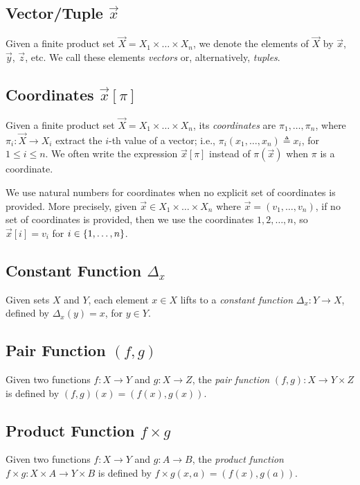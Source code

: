 \subsection{Vector/Tuple \texorpdfstring{$\vec{x}$}{x}}
Given a finite product set $\vec{X}=X_1\times \ldots \times X_n$, we denote the elements of $\vec{X}$ by $\vec{x}$, $\vec{y}$, $\vec{z}$, etc. We call these elements \emph{vectors} or, alternatively, \emph{tuples}. 

\subsection{Coordinates \texorpdfstring{$\vec{x}[\pi]$}{x[p]}}
Given a finite product set $\vec{X}=X_1\times \ldots \times X_n$, its \emph{coordinates} are $\pi_1, \ldots, \pi_n$, where $\pi_i\colon \vec{X} \rightarrow X_i$ extract the $i$-th value of a vector; i.e., $\pi_i(x_1, \ldots, x_n)\triangleq x_i$, for $1\leq i \leq n$. We often write the expression $\vec{x}[\pi]$ instead of $\pi(\vec{x})$ when $\pi$ is a coordinate. %

We use natural numbers for coordinates when no explicit set of coordinates is provided. More precisely, given $\vec{x}\in X_1\times \ldots \times X_n$ where $\vec{x}=(v_1, \ldots, v_n)$, if no set of coordinates is provided, then we use the coordinates $1, 2, \ldots , n$, so $\vec{x}[i]=v_i$ for $i\in \left\{1, \ldots, n\right\}$. 

\subsection{Constant Function \texorpdfstring{$\Delta_x$}{Constx}}
Given sets $X$ and $Y$, each element $x\in X$ lifts to a \emph{constant function} $\Delta_x\colon Y\rightarrow X$, defined by $\Delta_x(y)=x$, for $y\in Y$.

\subsection{Pair Function \texorpdfstring{$(f,g)$}{(f,g)}}
Given two functions $f\colon X\rightarrow Y$ and $g\colon X\rightarrow Z$, the \emph{pair function} $(f,g)\colon X\rightarrow Y\times Z$ is defined by $(f,g)(x)=(f(x),g(x))$.

\subsection{Product Function \texorpdfstring{$f\times g$}{fxg}}
Given two functions $f\colon X\rightarrow Y$ and $g\colon A\rightarrow B$, the \emph{product function} $f\times g\colon X\times A\rightarrow Y\times B$ is defined by $f\times g(x,a)=(f(x),g(a))$.

